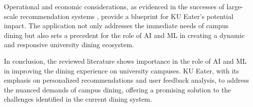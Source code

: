 Operational and economic considerations, as evidenced in the successes of large-scale recommendation systems \cite{sangwan:2023,netflix:2022},
provide a blueprint for KU Eater's potential impact. The application not only addresses the immediate needs of campus
dining but also sets a precedent for the role of AI and ML in creating a dynamic and responsive university dining ecosystem.

In conclusion, the reviewed literature shows importance in the role of AI and ML in improving the dining experience on university campuses.
KU Eater, with its emphasis on personalized recommendations and user feedback analysis,
to address the nuanced demands of campus dining, offering a promising solution to the challenges identified in the current dining system.